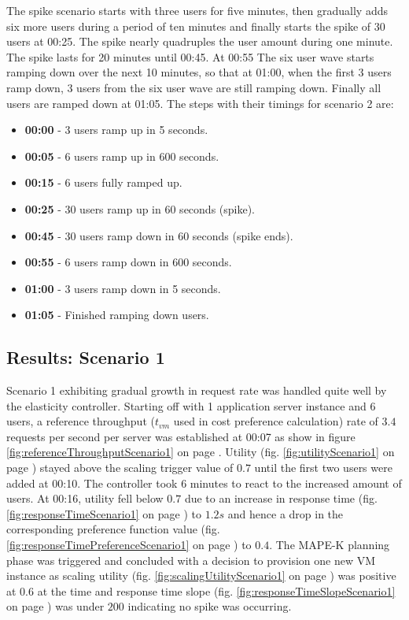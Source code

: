 \documentclass[english]{tktltiki2}
\theoremstyle{definition}
\theoremstyle{remark}
\begin{document}
The spike scenario starts with three users for five minutes, then gradually adds
six more users during a period of ten minutes and finally starts the spike of 30
users at 00:25. The spike nearly quadruples the user amount during one minute. The
spike lasts for 20 minutes until 00:45. At 00:55 The six user wave starts
ramping down over the next 10 minutes, so that at 01:00, when the first 3 users
ramp down, 3 users from the six user wave are still ramping down. Finally all
users are ramped down at 01:05. The steps with their timings for scenario 2 are:

\begin{itemize}
	\item{\textbf{00:00} - 3 users ramp up in 5 seconds.}
	\item{\textbf{00:05} - 6 users ramp up in 600 seconds.}
	\item{\textbf{00:15} - 6 users fully ramped up.}
	\item{\textbf{00:25} - 30 users ramp up in 60 seconds (spike).}
	\item{\textbf{00:45} - 30 users ramp down in 60 seconds (spike ends).}
	\item{\textbf{00:55} - 6 users ramp down in 600 seconds.}
	\item{\textbf{01:00} - 3 users ramp down in 5 seconds.}
	\item{\textbf{01:05} - Finished ramping down users.}	
	\label{gatlingStepsScenario2}
\end{itemize}

\subsection{Results: Scenario 1}
\label{sec:resultsScenario1}

Scenario 1 exhibiting gradual growth in request rate was handled quite well by
the elasticity controller. Starting off with 1 application server instance and 6
users, a reference throughput ($t_{vm}$ used in cost preference calculation)
rate of $3.4$ requests per second per server was established at 00:07 as show in
figure \ref{fig:referenceThroughputScenario1} on page
\pageref{fig:referenceThroughputScenario1}. Utility (fig.
\ref{fig:utilityScenario1} on page \pageref{fig:utilityScenario1}) stayed above
the scaling trigger value of $0.7$ until the first two users were added at
00:10. The controller took 6 minutes to react to the increased amount of users.
At 00:16, utility fell below $0.7$ due to an increase in response time (fig.
\ref{fig:responseTimeScenario1} on page \pageref{fig:responseTimeScenario1}) to
$1.2 s$ and hence a drop in the corresponding preference function value (fig.
\ref{fig:responseTimePreferenceScenario1} on page
\pageref{fig:responseTimePreferenceScenario1}) to $0.4$. The MAPE-K planning
phase was triggered and concluded with a decision to provision one new VM
instance as scaling utility (fig. \ref{fig:scalingUtilityScenario1} on page
\pageref{fig:scalingUtilityScenario1}) was positive at $0.6$ at the time and
response time slope (fig. \ref{fig:responseTimeSlopeScenario1} on page
\pageref{fig:responseTimeSlopeScenario1}) was under $200$ indicating no spike
was occurring.
\end{document}
